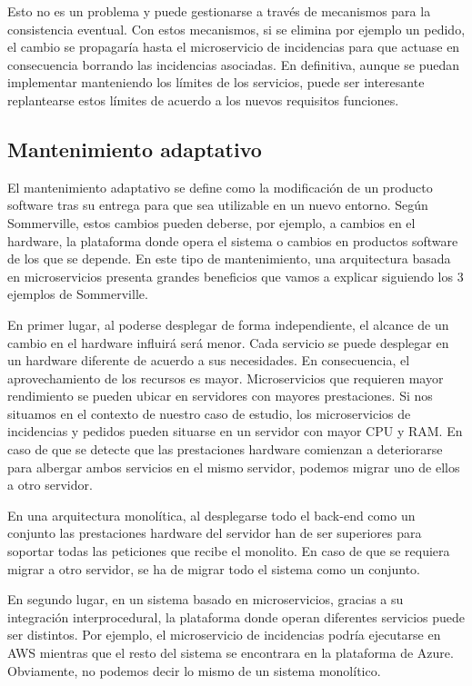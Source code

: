 \documentclass[11pt,spanish,listoffigures]{tfgetsinf}
\begin{document}
Esto no es un problema y puede gestionarse a través de mecanismos para la consistencia eventual. Con estos mecanismos, si se elimina por ejemplo un pedido, el cambio se propagaría hasta el microservicio de incidencias para que actuase en consecuencia borrando las incidencias asociadas. En definitiva, aunque se puedan implementar manteniendo los límites de los servicios, puede ser interesante replantearse estos límites de acuerdo a los nuevos requisitos funciones.

\subsection{Mantenimiento adaptativo}

El mantenimiento adaptativo se define como la modificación de un producto software tras su entrega para que sea utilizable en un nuevo entorno. \cite{Bourque2014} Según Sommerville, estos cambios pueden deberse, por ejemplo, a cambios en el hardware, la plataforma donde opera el sistema o cambios en productos software de los que se depende. \cite{Sommerville2010} En este tipo de mantenimiento, una arquitectura basada en microservicios presenta grandes beneficios que vamos a explicar siguiendo los 3 ejemplos de Sommerville.

En primer lugar, al poderse desplegar de forma independiente, el alcance de un cambio en el hardware influirá será menor. Cada servicio se puede desplegar en un hardware diferente de acuerdo a sus necesidades. En consecuencia, el aprovechamiento de los recursos es mayor. Microservicios que requieren mayor rendimiento se pueden ubicar en servidores con mayores prestaciones. Si nos situamos en el contexto de nuestro caso de estudio, los microservicios de incidencias y pedidos pueden situarse en un servidor con mayor CPU y RAM. En caso de que se detecte que las prestaciones hardware comienzan a deteriorarse para albergar ambos servicios en el mismo servidor, podemos migrar uno de ellos a otro servidor. 

En una arquitectura monolítica, al desplegarse todo el back-end como un conjunto las prestaciones hardware del servidor han de ser superiores para soportar todas las peticiones que recibe el monolito. En caso de que se requiera migrar a otro servidor, se ha de migrar todo el sistema como un conjunto.

En segundo lugar, en un sistema basado en microservicios, gracias a su integración interprocedural, la plataforma donde operan diferentes servicios puede ser distintos. Por ejemplo, el microservicio de incidencias podría ejecutarse en AWS mientras que el resto del sistema se encontrara en la plataforma de Azure. Obviamente, no podemos decir lo mismo de un sistema monolítico.
\end{document}
